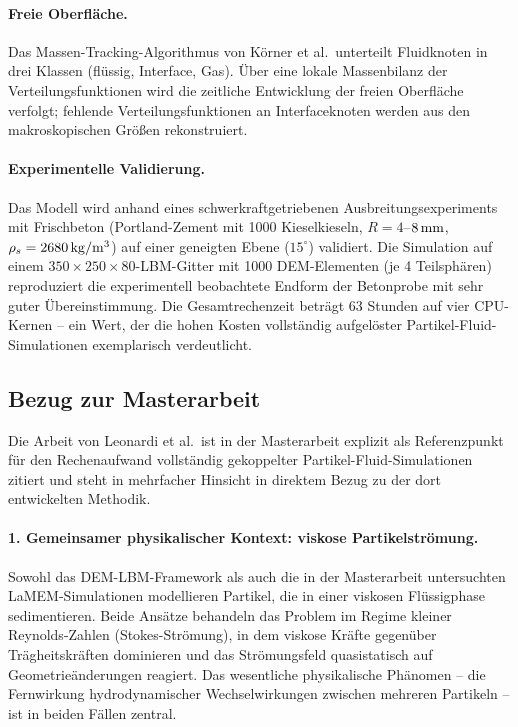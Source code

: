 \documentclass[a4paper,12pt]{article}
\begin{document}
\paragraph{Freie Oberfläche.}
Das Massen-Tracking-Algorithmus von Körner et al.\ unterteilt Fluidknoten in
drei Klassen (flüssig, Interface, Gas). Über eine lokale Massenbilanz der
Verteilungsfunktionen wird die zeitliche Entwicklung der freien Oberfläche
verfolgt; fehlende Verteilungsfunktionen an Interfaceknoten werden aus den
makroskopischen Größen rekonstruiert.

\paragraph{Experimentelle Validierung.}
Das Modell wird anhand eines schwerkraftgetriebenen Ausbreitungsexperiments
mit Frischbeton (Portland-Zement mit 1000 Kieselkieseln, $R = 4$--$8\,\rm
mm$, $\rho_s = 2680\,\rm kg/m^3$) auf einer geneigten Ebene ($15^\circ$)
validiert. Die Simulation auf einem $350 \times 250 \times 80$-LBM-Gitter mit
1000 DEM-Elementen (je 4 Teilsphären) reproduziert die experimentell beobachtete Endform der Betonprobe mit sehr guter Übereinstimmung. Die Gesamtrechenzeit beträgt 63 Stunden auf vier CPU-Kernen -- ein Wert, der die hohen
Kosten vollständig aufgelöster Partikel-Fluid-Simulationen exemplarisch
verdeutlicht.

\subsection*{Bezug zur Masterarbeit}

Die Arbeit von Leonardi et al.\ ist in der Masterarbeit explizit als
Referenzpunkt für den Rechenaufwand vollständig gekoppelter
Partikel-Fluid-Simulationen zitiert \cite{leonardi_coupled_2014} und
steht in mehrfacher Hinsicht in direktem Bezug zu der dort entwickelten
Methodik.

\paragraph{1. Gemeinsamer physikalischer Kontext: viskose Partikelströmung.}
Sowohl das DEM-LBM-Framework als auch die in der Masterarbeit untersuchten
LaMEM-Simulationen modellieren Partikel, die in einer viskosen Flüssigphase
sedimentieren. Beide Ansätze behandeln das Problem im Regime kleiner
Reynolds-Zahlen (Stokes-Strömung), in dem viskose Kräfte gegenüber Trägheitskräften dominieren und das Strömungsfeld quasistatisch auf Geometrieänderungen reagiert. Das wesentliche physikalische Phänomen -- die Fernwirkung
hydrodynamischer Wechselwirkungen zwischen mehreren Partikeln --
ist in beiden Fällen zentral.
\end{document}
